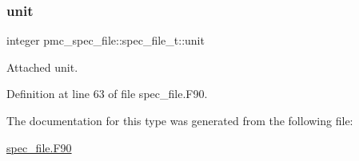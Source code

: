 \subsubsection{\texorpdfstring{unit}{unit}}
{\footnotesize\ttfamily integer pmc\+\_\+spec\+\_\+file\+::spec\+\_\+file\+\_\+t\+::unit}



Attached unit. 



Definition at line 63 of file spec\+\_\+file.\+F90.



The documentation for this type was generated from the following file\+:\begin{DoxyCompactItemize}
\item 
\mbox{\hyperlink{spec__file_8_f90}{spec\+\_\+file.\+F90}}\end{DoxyCompactItemize}
